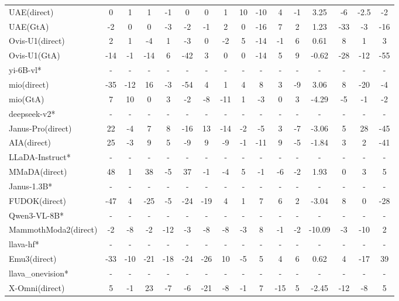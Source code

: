\documentclass{article}
\theoremstyle{plain}
\theoremstyle{definition}
\theoremstyle{remark}
\begin{document}
\begin{table}[!htbp]
{\begin{tabular}{@{}lccccccccccccccc@{}}
UAE(direct) & 0 & 1 & 1 & -1 & 0 & 0 & 1 & 10 & -10 & 4 & -1 & 3.25 & -6 & -2.5 & -2 \\
UAE(GtA) & -2 & 0 & 0 & -3 & -2 & -1 & 2 & 0 & -16 & 7 & 2 & 1.23 & -33 & -3 & -16 \\
Ovis-U1(direct) & 2 & 1 & -4 & 1 & -3 & 0 & -2 & 5 & -14 & -1 & 6 & 0.61 & 8 & 1 & 3 \\
Ovis-U1(GtA) & -14 & -1 & -14 & 6 & -42 & 3 & 0 & 0 & -14 & 5 & 9 & -0.62 & -28 & -12 & -55 \\
\midrule
\rowcolor{gray!12}
yi-6B-vl* & - & - & - & - & - & - & - & - & - & - & - & - & - & - & - \\
mio(direct) & -35 & -12 & 16 & -3 & -54 & 4 & 1 & 4 & 8 & 3 & -9 & 3.06 & 8 & -20 & -4 \\
mio(GtA) & 7 & 10 & 0 & 3 & -2 & -8 & -11 & 1 & -3 & 0 & 3 & -4.29 & -5 & -1 & -2 \\
\midrule
\rowcolor{gray!12}
deepseek-v2* & - & - & - & - & - & - & - & - & - & - & - & - & - & - & - \\
Janus-Pro(direct) & 22 & -4 & 7 & 8 & -16 & 13 & -14 & -2 & -5 & 3 & -7 & -3.06 & 5 & 28 & -45 \\
AIA(direct) & 25 & -3 & 9 & 5 & -9 & 9 & -9 & -1 & -11 & 9 & -5 & -1.84 & 3 & 2 & -41 \\
\midrule
\rowcolor{gray!12}
LLaDA-Instruct* & - & - & - & - & - & - & - & - & - & - & - & - & - & - & - \\
MMaDA(direct) & 48 & 1 & 38 & -5 & 37 & -1 & -4 & 5 & -1 & -6 & -2 & 1.93 & 0 & 3 & 5 \\
\midrule
\rowcolor{gray!12}
Janus-1.3B* & - & - & - & - & - & - & - & - & - & - & - & - & - & - & - \\
FUDOK(direct) & -47 & 4 & -25 & -5 & -24 & -19 & 4 & 1 & 7 & 6 & 2 & -3.04 & 8 & 0 & -28 \\
\midrule
\rowcolor{gray!12}
Qwen3-VL-8B* & - & - & - & - & - & - & - & - & - & - & - & - & - & - & - \\
MammothModa2(direct) & -2 & -8 & -2 & -12 & -3 & -8 & -8 & -3 & 8 & -1 & -2 & -10.09 & -3 & -10 & 2 \\
\midrule
\rowcolor{gray!12}
llava-hf* & - & - & - & - & - & - & - & - & - & - & - & - & - & - & - \\
Emu3(direct) & -33 & -10 & -21 & -18 & -24 & -26 & 10 & -5 & 5 & 4 & 6 & 0.62 & 4 & -17 & 39 \\
\midrule
\rowcolor{gray!12}
llava\_onevision* & - & - & - & - & - & - & - & - & - & - & - & - & - & - & - \\
X-Omni(direct) & 5 & -1 & 23 & -7 & -6 & -21 & -8 & -1 & 7 & -15 & 5 & -2.45 & -12 & -8 & 5 \\

\end{tabular}}
\end{table}
\end{document}
